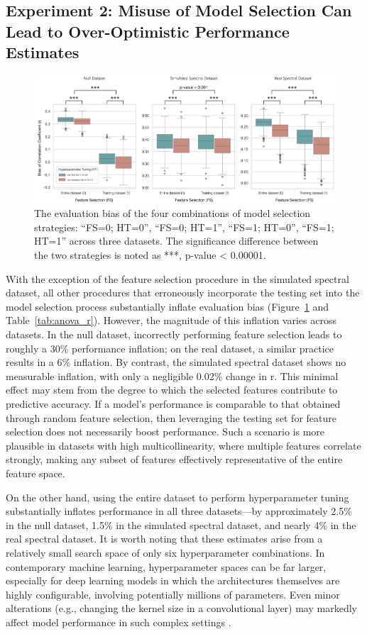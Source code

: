 \subsection{Experiment 2: Misuse of Model Selection Can Lead to Over-Optimistic Performance Estimates}

\begin{figure}[H]
    \centering
    \includegraphics[width=1\textwidth]{fig_7.jpg}
    \caption{The evaluation bias of the four combinations of model selection strategies: “FS=0; HT=0”, “FS=0; HT=1”, “FS=1; HT=0”, “FS=1; HT=1” across three datasets. The significance difference between the two strategies is noted as ***, p-value < 0.00001.}
    \label{fig:s2_results}
\end{figure}

With the exception of the feature selection procedure in the simulated spectral dataset, all other procedures that erroneously incorporate the testing set into the model selection process substantially inflate evaluation bias (Figure~\ref{fig:s2_results} and Table~\ref{tab:anova_r}). However, the magnitude of this inflation varies across datasets. In the null dataset, incorrectly performing feature selection leads to roughly a 30\% performance inflation; on the real dataset, a similar practice results in a 6\% inflation. By contrast, the simulated spectral dataset shows no measurable inflation, with only a negligible 0.02\% change in r. This minimal effect may stem from the degree to which the selected features contribute to predictive accuracy. If a model’s performance is comparable to that obtained through random feature selection, then leveraging the testing set for feature selection does not necessarily boost performance. Such a scenario is more plausible in datasets with high multicollinearity, where multiple features correlate strongly, making any subset of features effectively representative of the entire feature space.

On the other hand, using the entire dataset to perform hyperparameter tuning substantially inflates performance in all three datasets—by approximately 2.5\% in the null dataset, 1.5\% in the simulated spectral dataset, and nearly 4\% in the real spectral dataset. It is worth noting that these estimates arise from a relatively small search space of only six hyperparameter combinations. In contemporary machine learning, hyperparameter spaces can be far larger, especially for deep learning models in which the architectures themselves are highly configurable, involving potentially millions of parameters. Even minor alterations (e.g., changing the kernel size in a convolutional layer) may markedly affect model performance in such complex settings \citep{zoph_neural_2017}.

